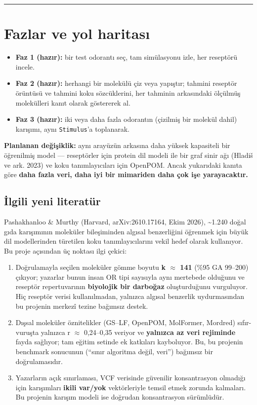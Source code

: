 \documentclass[11pt,a4paper]{article}
\begin{document}
\vspace{0.4\baselineskip}
\hrule
\vspace{0.9\baselineskip}


\section{Fazlar ve yol haritası}

\begin{itemize}
\item \textbf{Faz 1 (hazır):} bir test odorantı seç, tam simülasyonu izle, her reseptörü incele.
\item \textbf{Faz 2 (hazır):} herhangi bir molekülü çiz veya yapıştır; tahmini reseptör örüntüsü ve tahmini koku sözcüklerini, her tahminin arkasındaki ölçülmüş molekülleri kanıt olarak göstererek al.
\item \textbf{Faz 3 (hazır):} iki veya daha fazla odorantın (çizilmiş bir molekül dahil) karışımı, aynı \texttt{\small Stimulus}'a toplanarak.
\end{itemize}

\textbf{Planlanan değişiklik:} aynı arayüzün arkasına daha yüksek kapasiteli bir öğrenilmiş model — reseptörler için protein dil modeli ile bir graf sinir ağı (Hladiš ve ark. 2023) ve koku tanımlayıcıları için OpenPOM. Ancak yukarıdaki kanıta göre \textbf{daha fazla veri, daha iyi bir mimariden daha çok işe yarayacaktır.}


\subsection{İlgili yeni literatür}

Pashakhanloo \& Murthy (Harvard, arXiv:2610.17164, Ekim 2026), \textasciitilde{}1.240 doğal gıda karışımının moleküler bileşiminden algısal benzerliğini öğrenmek için büyük dil modellerinden türetilen koku tanımlayıcılarını vekil hedef olarak kullanıyor. Bu proje açısından üç noktası ilgi çekici:

\begin{enumerate}
\item Doğrulamayla seçilen moleküler gömme boyutu \textbf{k \(\approx\) 141} (\%95 GA 99–200) çıkıyor; yazarlar bunun insan OR tipi sayısıyla aynı mertebede olduğunu ve reseptör repertuvarının \textbf{biyolojik bir darboğaz} oluşturduğunu vurguluyor. Hiç reseptör verisi kullanılmadan, yalnızca algısal benzerlik uydurmasından bu projenin merkezî tezine bağımsız destek.
\item Dışsal moleküler öznitelikler (GS–LF, OpenPOM, MolFormer, Mordred) sıfır-vuruşta yalnızca r \(\approx\) 0,24–0,35 veriyor ve \textbf{yalnızca az veri rejiminde} fayda sağlıyor; tam eğitim setinde ek katkıları kayboluyor. Bu, bu projenin benchmark sonucunun (``sınır algoritma değil, veri'') bağımsız bir doğrulamasıdır.
\item Yazarların açık sınırlaması, VCF verisinde güvenilir konsantrasyon olmadığı için karışımları \textbf{ikili var/yok} vektörleriyle temsil etmek zorunda kalmaları. Bu projenin karışım modeli ise doğrudan konsantrasyon sürümlüdür.
\end{enumerate}
\end{document}
